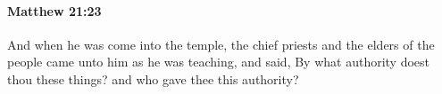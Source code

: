 			\begin{framed}
			\scriptsize
				\begin{compactdesc}
					\item[SBLG] 
				\end{compactdesc}
			\end{framed}

		\paragraph{Matthew 21:23} %
			\label{MATTHEW-21-23}

			And when he was come into the temple, the chief priests and the elders of the people came unto him as he was teaching, and said, By what authority doest thou these things? and who gave thee this authority?

			\begin{framed}
			\scriptsize
				\begin{compactdesc}
					\item[SBLG]  \hyperref[EXOUSIA]{}  \hyperref[EXOUSIA]{} \gr{ταύτην;}
				\end{compactdesc}
			\end{framed}

